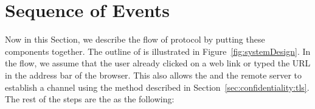 \section*{\name Sequence of Events}
\label{appendix:protocol}

\iffalse
\begin{figure}[t]
\centering
\texttt{[image: systemDesign.pdf]}
\caption{\textbf{Flow of the \name main protocol.} The figure shows the high-level protocol flow and the main messages that are exchanged between the remote server, host, \device, and the Io devices.}
\spacesave
\label{fig:systemDesign}
\centering
\end{figure}
\fi

Now in this Section, we describe the flow of \name protocol by putting these components together. The outline of \name is illustrated in Figure~\ref{fig:systemDesign}. In the flow, we assume that the user already clicked on a web link or typed the URL in the address bar of the browser. This also allows the \device and the remote server to establish a \tls channel using the method described in Section~\ref{sec:confidentiality:tls}. The rest of the steps are the as the following:


